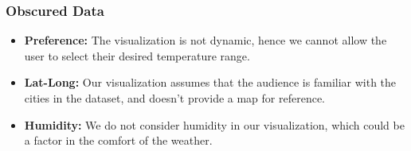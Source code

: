 \documentclass{article}
\begin{document}
\subsubsection{Obscured Data}
    \begin{itemize}
        \item \textbf{Preference:} The visualization is not dynamic, hence we cannot allow the user to select their desired temperature range.
        \item \textbf{Lat-Long:} Our visualization assumes that the audience is familiar with the cities in the dataset, and doesn't provide a map for reference.
        \item \textbf{Humidity:} We do not consider humidity in our visualization, which could be a factor in the comfort of the weather.
    \end{itemize}



\end{document}
